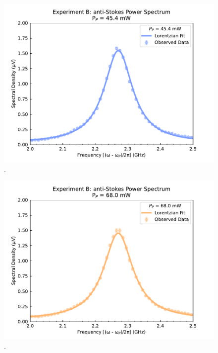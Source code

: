 \begin{figure}[t]
  \centering
  \includegraphics[width=\textwidth]{figs/3-Cooling/P-P anti-Stokes Fit - 110mW.pdf}
  \caption{.}
  \label{fig:Cooling:P-P anti-Stokes Fit - 110mW}
\end{figure}

\begin{figure}[t]
  \centering
  \includegraphics[width=\textwidth]{figs/3-Cooling/P-P anti-Stokes Fit - 165mW.pdf}
  \caption{.}
  \label{fig:Cooling:P-P anti-Stokes Fit - 165mW}
\end{figure}

